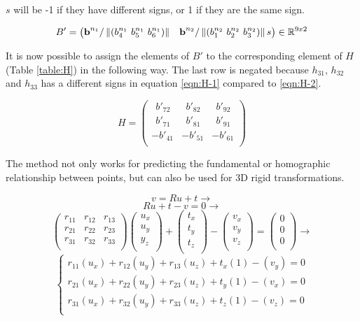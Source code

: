 $s$ will be -1 if they have different signs, or 1 if they are the same sign.

\[
B'=
\begin{pmatrix}
\textbf{b}^{n_1} / \left\lVert(b^{n_1}_4 \ b^{n_1}_5 \ b^{n_1}_6)
\right\rVert &
\textbf{b}^{n_2} / \left\lVert(b^{n_2}_1 \ b^{n_2}_2 \ b^{n_2}_3)\right\rVert s
\end{pmatrix}
\in \mathbb{R}^{9x2}
\]

It is now possible to assign the elements of $B'$ to the corresponding element of $H$ (Table \ref{table:H}) in the following way. The last row is negated because $h_{31}$, $h_{32}$ and $h_{33}$ has a different signs in equation \ref{eqn:H-1} compared to \ref{eqn:H-2}.

\[
H=
\begin{pmatrix}
\ \ b'_{72} & \ \ b'_{82} & \ \ b'_{92} \\
\ \ b'_{71} & \ \ b'_{81} & \ \ b'_{91} \\
-b'_{41} & -b'_{51} & -b'_{61} \\
\end{pmatrix}
\]

The method not only works for predicting the fundamental or homographic relationship between points, but can also be used for 3D rigid transformations.

\[
v=Ru+t \rightarrow
\]
\[
Ru+t-v=0 \rightarrow
\]
\[
\begin{pmatrix}
r_{11} & r_{12} & r_{13} \\
r_{21} & r_{22} & r_{23} \\
r_{31} & r_{32} & r_{33} \\
\end{pmatrix}
\begin{pmatrix}
u_x \\
u_y \\
y_z \\
\end{pmatrix}
+
\begin{pmatrix}
t_x \\
t_y \\
t_z \\
\end{pmatrix}
-
\begin{pmatrix}
v_x \\
v_y \\
v_z \\
\end{pmatrix}
=
\begin{pmatrix}
0 \\
0 \\
0 \\
\end{pmatrix}
\rightarrow
\]
\[
\begin{cases}
r_{11} (u_x) + r_{12} (u_y) + r_{13} (u_z) + t_x (1) - (v_y) = 0 \\
r_{21} (u_x) + r_{22} (u_y) + r_{23} (u_z) + t_y (1) - (v_x) = 0 \\
r_{31} (u_x) + r_{32} (u_y) + r_{33} (u_z) + t_z (1) - (v_z) = 0 \\
\end{cases}
\]

